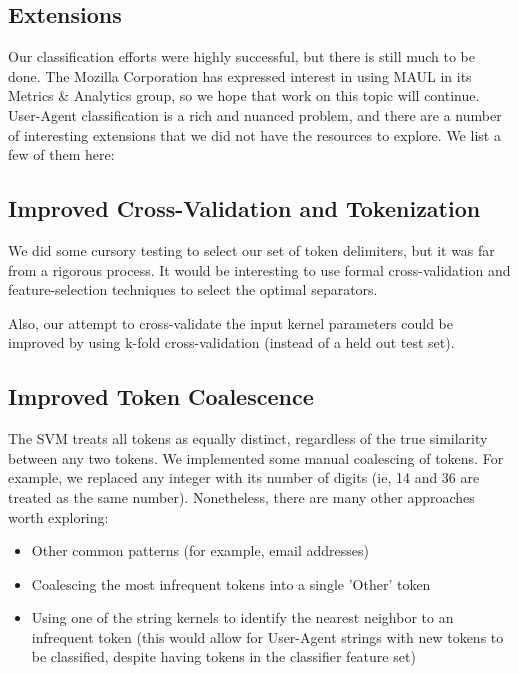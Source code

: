 \documentclass[10pt]{article}
\begin{document}
\begin{multicols}{2}
\section{Extensions}

Our classification efforts were highly successful, but there is still much to be done. The Mozilla Corporation has expressed interest in using MAUL in its Metrics \& Analytics group, so we hope that work on this topic will continue. User-Agent classification is a rich and nuanced problem, and there are a number of interesting extensions that we did not have the resources to explore. We list a few of them here:

\subsection{Improved Cross-Validation and Tokenization}

We did some cursory testing to select our set of token delimiters, but it was far from a rigorous process. It would be interesting to use formal cross-validation and feature-selection techniques to select the optimal separators.

Also, our attempt to cross-validate the input kernel parameters could be improved by using k-fold cross-validation (instead of a held out test set).  

\subsection{Improved Token Coalescence}

The SVM treats all tokens as equally distinct, regardless of the true similarity between any two tokens. We implemented some manual coalescing of tokens. For example, we replaced any integer with its number of digits (ie, 14 and 36 are treated as the same number). Nonetheless, there are many other approaches worth exploring:

\begin{itemize}
\item Other common patterns (for example, email addresses)
\item Coalescing the most infrequent tokens into a single 'Other' token
\item Using one of the string kernels to identify the nearest neighbor to an infrequent token (this would allow for User-Agent strings with new tokens to be classified, despite having tokens in the classifier feature set)
\end{itemize}



\end{multicols}
\end{document}

